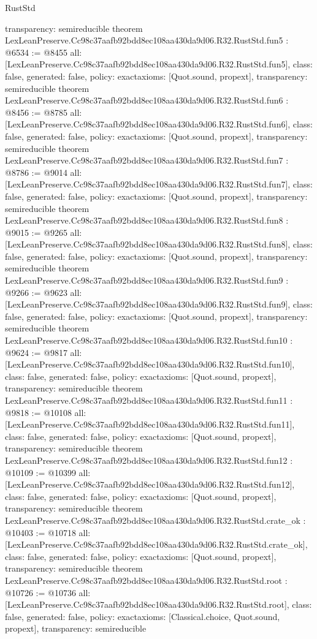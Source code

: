 \begin{lexlean}{RustStd}
\begin{coremodule}
{  transparency: semireducible
}
theorem LexLeanPreserve.Cc98c37aafb92bdd8ec108aa430da9d06.R32.RustStd.fun5 : @6534 := @8455 {
  all: [LexLeanPreserve.Cc98c37aafb92bdd8ec108aa430da9d06.R32.RustStd.fun5],
  class: false,
  generated: false,
  policy: exact{axioms: [Quot.sound, propext]},
  transparency: semireducible
}
theorem LexLeanPreserve.Cc98c37aafb92bdd8ec108aa430da9d06.R32.RustStd.fun6 : @8456 := @8785 {
  all: [LexLeanPreserve.Cc98c37aafb92bdd8ec108aa430da9d06.R32.RustStd.fun6],
  class: false,
  generated: false,
  policy: exact{axioms: [Quot.sound, propext]},
  transparency: semireducible
}
theorem LexLeanPreserve.Cc98c37aafb92bdd8ec108aa430da9d06.R32.RustStd.fun7 : @8786 := @9014 {
  all: [LexLeanPreserve.Cc98c37aafb92bdd8ec108aa430da9d06.R32.RustStd.fun7],
  class: false,
  generated: false,
  policy: exact{axioms: [Quot.sound, propext]},
  transparency: semireducible
}
theorem LexLeanPreserve.Cc98c37aafb92bdd8ec108aa430da9d06.R32.RustStd.fun8 : @9015 := @9265 {
  all: [LexLeanPreserve.Cc98c37aafb92bdd8ec108aa430da9d06.R32.RustStd.fun8],
  class: false,
  generated: false,
  policy: exact{axioms: [Quot.sound, propext]},
  transparency: semireducible
}
theorem LexLeanPreserve.Cc98c37aafb92bdd8ec108aa430da9d06.R32.RustStd.fun9 : @9266 := @9623 {
  all: [LexLeanPreserve.Cc98c37aafb92bdd8ec108aa430da9d06.R32.RustStd.fun9],
  class: false,
  generated: false,
  policy: exact{axioms: [Quot.sound, propext]},
  transparency: semireducible
}
theorem LexLeanPreserve.Cc98c37aafb92bdd8ec108aa430da9d06.R32.RustStd.fun10 : @9624 := @9817 {
  all: [LexLeanPreserve.Cc98c37aafb92bdd8ec108aa430da9d06.R32.RustStd.fun10],
  class: false,
  generated: false,
  policy: exact{axioms: [Quot.sound, propext]},
  transparency: semireducible
}
theorem LexLeanPreserve.Cc98c37aafb92bdd8ec108aa430da9d06.R32.RustStd.fun11 : @9818 := @10108 {
  all: [LexLeanPreserve.Cc98c37aafb92bdd8ec108aa430da9d06.R32.RustStd.fun11],
  class: false,
  generated: false,
  policy: exact{axioms: [Quot.sound, propext]},
  transparency: semireducible
}
theorem LexLeanPreserve.Cc98c37aafb92bdd8ec108aa430da9d06.R32.RustStd.fun12 : @10109 := @10399 {
  all: [LexLeanPreserve.Cc98c37aafb92bdd8ec108aa430da9d06.R32.RustStd.fun12],
  class: false,
  generated: false,
  policy: exact{axioms: [Quot.sound, propext]},
  transparency: semireducible
}
theorem LexLeanPreserve.Cc98c37aafb92bdd8ec108aa430da9d06.R32.RustStd.crate_ok : @10403 := @10718 {
  all: [LexLeanPreserve.Cc98c37aafb92bdd8ec108aa430da9d06.R32.RustStd.crate_ok],
  class: false,
  generated: false,
  policy: exact{axioms: [Quot.sound, propext]},
  transparency: semireducible
}
theorem LexLeanPreserve.Cc98c37aafb92bdd8ec108aa430da9d06.R32.RustStd.root : @10726 := @10736 {
  all: [LexLeanPreserve.Cc98c37aafb92bdd8ec108aa430da9d06.R32.RustStd.root],
  class: false,
  generated: false,
  policy: exact{axioms: [Classical.choice, Quot.sound, propext]},
  transparency: semireducible
}


\end{coremodule}
\end{lexlean}
